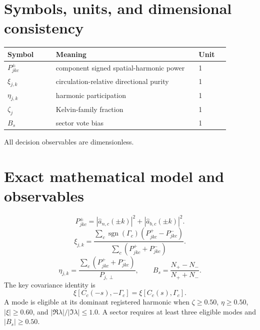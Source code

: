 \documentclass[11pt,a4paper]{article}
\begin{document}
\section{Symbols, units, and dimensional consistency}
\begin{longtable}{L{0.19\linewidth}L{0.57\linewidth}L{0.12\linewidth}}\toprule Symbol&Meaning&Unit\\\midrule
$P_{jkc}^{\pm}$&component signed spatial-harmonic power&1\\$\xi_{j,k}$&circulation-relative directional purity&1\\$\eta_{j,k}$&harmonic participation&1\\$\zeta_j$&Kelvin-family fraction&1\\$B_s$&sector vote bias&1\\\bottomrule\end{longtable}
All decision observables are dimensionless.
\section{Exact mathematical model and observables}
\begin{equation}P_{jkc}^{\pm}=|\widehat a_{n,c}(\pm k)|^2+|\widehat a_{b,c}(\pm k)|^2.\end{equation}
\begin{equation}\xi_{j,k}=\frac{\sum_c\operatorname{sgn}(\Gamma_c)(P_{jkc}^{+}-P_{jkc}^{-})}{\sum_c(P_{jkc}^{+}+P_{jkc}^{-})}.\end{equation}
\begin{equation}\eta_{j,k}=\frac{\sum_c(P_{jkc}^{+}+P_{jkc}^{-})}{P_{j,\perp}},\qquad B_s=\frac{N_+-N_-}{N_++N_-}.\end{equation}
The key covariance identity is
\begin{equation}\xi[C_c(-s),-\Gamma_c]=\xi[C_c(s),\Gamma_c].\end{equation}
A mode is eligible at its dominant registered harmonic when $\zeta\ge0.50$, $\eta\ge0.50$, $|\xi|\ge0.60$, and $|\Re\lambda|/|\Im\lambda|\le1.0$. A sector requires at least three eligible modes and $|B_s|\ge0.50$.
\end{document}
